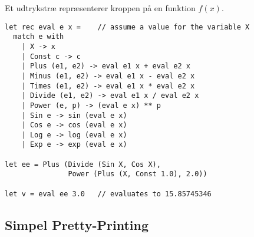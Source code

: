 \documentclass[rgb]{beamer}
\begin{document}
\begin{frame}[fragile]
\begin{footnotesize}

  \vspace{1ex}

  Et udtrykstræ repræsenterer kroppen på en funktion $f(x)$.

\begin{lstlisting}[numbers=none,frame=none,mathescape]
let rec eval e x =    // assume a value for the variable X
  match e with
    | X -> x
    | Const c -> c
    | Plus (e1, e2) -> eval e1 x + eval e2 x
    | Minus (e1, e2) -> eval e1 x - eval e2 x
    | Times (e1, e2) -> eval e1 x * eval e2 x
    | Divide (e1, e2) -> eval e1 x / eval e2 x
    | Power (e, p) -> (eval e x) ** p
    | Sin e -> sin (eval e x)
    | Cos e -> cos (eval e x)
    | Log e -> log (eval e x)
    | Exp e -> exp (eval e x)

let ee = Plus (Divide (Sin X, Cos X),
               Power (Plus (X, Const 1.0), 2.0))

let v = eval ee 3.0   // evaluates to 15.85745346
\end{lstlisting}

\vspace{-5cm}\hspace{8.3cm}
\vspace{5cm}

\end{footnotesize}
\end{frame}

\subsection{Simpel Pretty-Printing}
\end{document}
